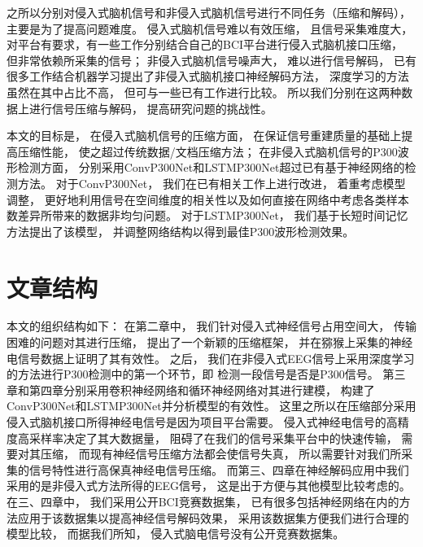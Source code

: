 之所以分别对侵入式脑机信号和非侵入式脑机信号进行不同任务（压缩和解码）， 主要是为了提高问题难度。 侵入式脑机信号难以有效压缩， 且信号采集难度大，对平台有要求，有一些工作分别结合自己的BCI平台进行侵入式脑机接口压缩， 但非常依赖所采集的信号；  非侵入式脑机信号噪声大， 难以进行信号解码， 已有很多工作结合机器学习提出了非侵入式脑机接口神经解码方法， 深度学习的方法虽然在其中占比不高， 但可与一些已有工作进行比较。 所以我们分别在这两种数据上进行信号压缩与解码， 提高研究问题的挑战性。 


本文的目标是， 在侵入式脑机信号的压缩方面， 在保证信号重建质量的基础上提高压缩性能， 使之超过传统数据/文档压缩方法； 在非侵入式脑机信号的P300波形检测方面， 分别采用ConvP300Net和LSTMP300Net超过已有基于神经网络的检测方法。  对于ConvP300Net， 我们在已有相关工作上进行改进， 着重考虑模型调整， 更好地利用信号在空间维度的相关性以及如何直接在网络中考虑各类样本数差异所带来的数据非均匀问题。 对于LSTMP300Net， 我们基于长短时间记忆方法提出了该模型， 并调整网络结构以得到最佳P300波形检测效果。



\section{文章结构}

本文的组织结构如下： 在第二章中， 我们针对侵入式神经信号占用空间大， 传输困难的问题对其进行压缩， 提出了一个新颖的压缩框架， 并在猕猴上采集的神经电信号数据上证明了其有效性。 之后， 我们在非侵入式EEG信号上采用深度学习的方法进行P300检测中的第一个环节，即 检测一段信号是否是P300信号。 第三章和第四章分别采用卷积神经网络和循环神经网络对其进行建模， 构建了ConvP300Net和LSTMP300Net并分析模型的有效性。 这里之所以在压缩部分采用侵入式脑机接口所得神经电信号是因为项目平台需要。 侵入式神经电信号的高精度高采样率决定了其大数据量， 阻碍了在我们的信号采集平台中的快速传输， 需要对其压缩， 而现有神经信号压缩方法都会使信号失真， 所以需要针对我们所采集的信号特性进行高保真神经电信号压缩。 而第三、四章在神经解码应用中我们采用的是非侵入式方法所得的EEG信号， 这是出于方便与其他模型比较考虑的。 在三、四章中， 我们采用公开BCI竞赛数据集\cite{blankertz2006bci}， 已有很多包括神经网络在内的方法应用于该数据集以提高神经信号解码效果， 采用该数据集方便我们进行合理的模型比较， 而据我们所知， 侵入式脑电信号没有公开竞赛数据集。









